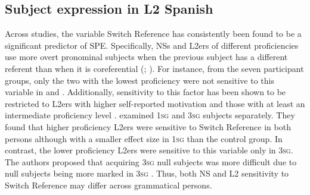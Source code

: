 \documentclass[output=paper,colorlinks,citecolor=brown,draftmode]{langscibook}
\begin{document}
\subsection{Subject expression in L2 Spanish}

Across studies, the variable Switch Reference has consistently been found to be a significant predictor of SPE. Specifically, NSs and L2ers of different proficiencies use more overt pronominal subjects when the previous subject has a different referent than when it is coreferential (\citealp{LinfordShin2013}; \citealp{Linford2014}). For instance, from the seven participant groups, only the two with the lowest proficiency were not sensitive to this variable in \citet{GeeslinDíaz-Campos2013} and \citet{GeeslinFafulas2015}. Additionally, sensitivity to this factor has been shown to be restricted to L2ers with higher self-reported motivation and those with at least an intermediate proficiency level \citep{Linford2014}. \citet{PradaPérezFeroce2020} examined 1\textsc{sg} and 3\textsc{sg} subjects separately. They found that higher proficiency L2ers were sensitive to Switch Reference in both persons although with a smaller effect size in 1\textsc{sg} than the control group. In contrast, the lower proficiency L2ers were sensitive to this variable only in 3\textsc{sg}. The authors proposed that acquiring 3\textsc{sg} null subjects was more difficult due to null subjects being more marked in 3\textsc{sg} \citep{Artstein1999}. Thus, both NS and L2 sensitivity to Switch Reference may differ across grammatical persons.
\end{document}
